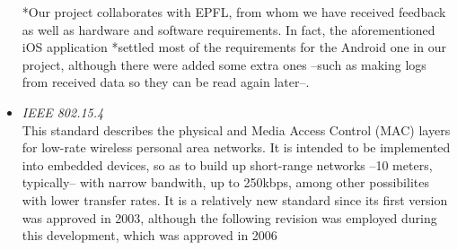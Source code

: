\begin{itemize}
				*Our project collaborates with EPFL, from whom we have received feedback as well as hardware and %
				software requirements. In fact, the aforementioned iOS application *settled most of the
				requirements for the Android one in our project, although there were added some extra ones --such as
				making logs from received data so they can be read again later--.\\
			\item \emph{IEEE 802.15.4}\\
				This standard describes the physical and Media Access Control (MAC) layers for low-rate wireless
				personal area networks. It is intended to be implemented into embedded devices, so as to build up
				short-range networks --10 meters, typically-- with narrow bandwith, up to 250kbps, among other
				possibilites with lower transfer rates. It is a relatively new standard since its first version
				was approved in 2003, although the following revision was employed during this development, which
				was approved in 2006 \cite{802.15.4}\\


\end{itemize}
